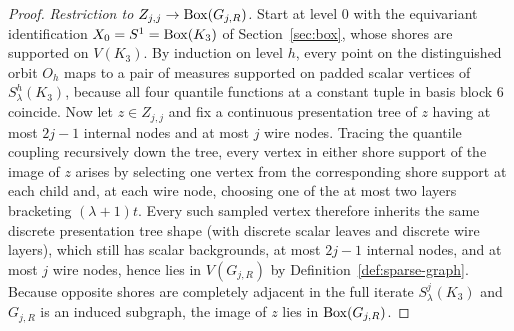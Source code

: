 \begin{proof}
\emph{Restriction to $Z_{j,j}\to\operatorname{Box}(G_{j,R})$.} Start at level $0$ with the equivariant identification $X_0=S^1=\operatorname{Box}(K_3)$ of Section~\ref{sec:box}, whose shores are supported on $V(K_3)$. By induction on level $h$, every point on the distinguished orbit $O_h$ maps to a pair of measures supported on padded scalar vertices of $S^h_\lambda(K_3)$, because all four quantile functions at a constant tuple in basis block $6$ coincide. Now let $z\in Z_{j,j}$ and fix a continuous presentation tree of $z$ having at most $2j-1$ internal nodes and at most $j$ wire nodes. Tracing the quantile coupling recursively down the tree, every vertex in either shore support of the image of $z$ arises by selecting one vertex from the corresponding shore support at each child and, at each wire node, choosing one of the at most two layers bracketing $(\lambda+1)t$. Every such sampled vertex therefore inherits the same discrete presentation tree shape (with discrete scalar leaves and discrete wire layers), which still has scalar backgrounds, at most $2j-1$ internal nodes, and at most $j$ wire nodes, hence lies in $V(G_{j,R})$ by Definition~\ref{def:sparse-graph}. Because opposite shores are completely adjacent in the full iterate $S^j_\lambda(K_3)$ and $G_{j,R}$ is an induced subgraph, the image of $z$ lies in $\operatorname{Box}(G_{j,R})$.
\end{proof}
